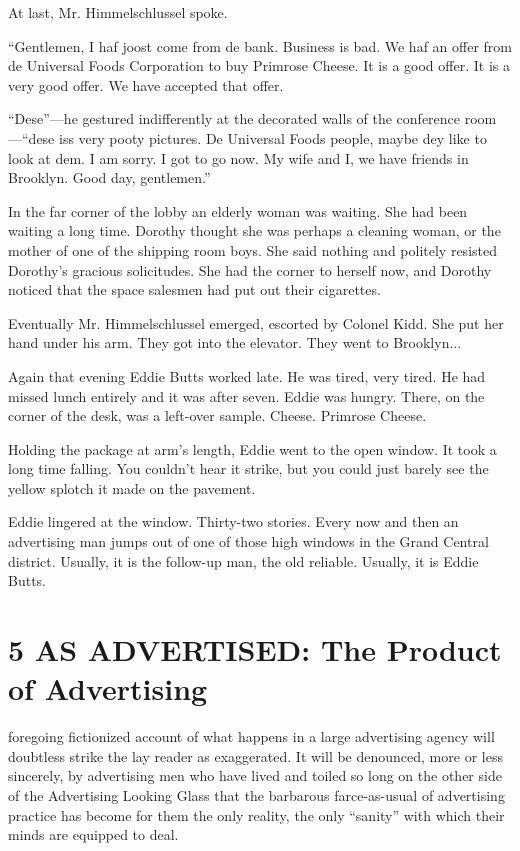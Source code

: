 \documentclass[nohyper,openany,nobib]{tufte-book}
\let\oldchapter\chapter
\def\chapter{%
  \setcounter{footnote}{0}%
  \oldchapter
}
\begin{document}
At last, Mr. Himmelschlussel spoke.

``Gentlemen, I haf joost come from de bank. Business is bad. We haf an
offer from de Universal Foods Corporation to buy Primrose Cheese. It is
a good offer. It is a very good offer. We have accepted that offer.

``Dese''---he gestured indifferently at the decorated walls of the
conference room---``dese iss very pooty pictures. De Universal Foods
people, maybe dey like to look at dem. I am sorry. I got to go now. My
wife and I, we have friends in Brooklyn. Good day, gentlemen.''

In the far corner of the lobby an elderly woman was waiting. She had
been waiting a long time. Dorothy thought she was perhaps a cleaning
woman, or the mother of one of the shipping room boys. She said nothing
and politely resisted Dorothy's gracious solicitudes. She had the corner
to herself now, and Dorothy noticed that the space salesmen had put out
their cigarettes.

Eventually Mr. Himmelschlussel emerged, escorted by Colonel Kidd. She
put her hand under his arm. They got into the elevator. They went to
Brooklyn...

Again that evening Eddie Butts worked late. He was tired, very tired. He
had missed lunch entirely and it was after seven. Eddie was hungry.
There, on the corner of the desk, was a left-over sample. Cheese.
Primrose Cheese.

Holding the package at arm's length, Eddie went to the open window. It
took a long time falling. You couldn't hear it strike, but you could
just barely see the yellow splotch it made on the pavement.

Eddie lingered at the window. Thirty-two stories. Every now and then an
advertising man jumps out of one of those high windows in the Grand
Central district. Usually, it is the follow-up man, the old reliable.
Usually, it is Eddie Butts.



\chapter[5 \hspace*{1mm} AS ADVERTISED: The Product of Advertising]{5 AS ADVERTISED: The Product of Advertising}

 foregoing fictionized account of what happens in a large advertising
agency will doubtless strike the lay reader as exaggerated. It will be
denounced, more or less sincerely, by advertising men who have lived and
toiled so long on the other side of the Advertising Looking Glass that
the barbarous farce-as-usual of advertising practice has become for them
the only reality, the only ``sanity'' with which their minds are
equipped to deal.
\end{document}
